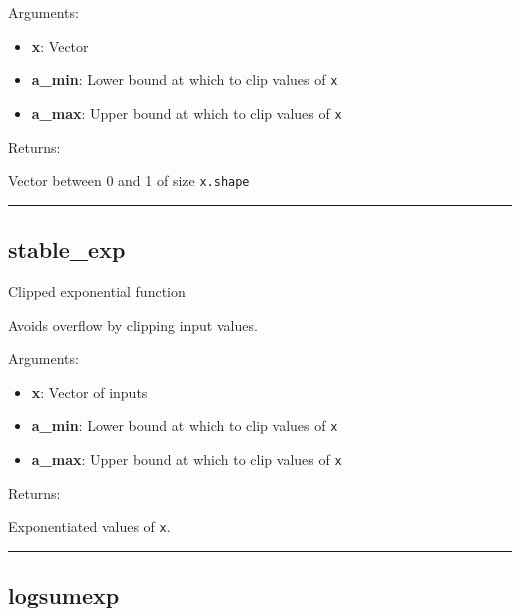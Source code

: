 Arguments:

\begin{itemize}
\tightlist
\item
  \textbf{x}: Vector
\item
  \textbf{a\_min}: Lower bound at which to clip values of \texttt{x}
\item
  \textbf{a\_max}: Upper bound at which to clip values of \texttt{x}
\end{itemize}

Returns:

Vector between 0 and 1 of size \texttt{x.shape}

\begin{center}\rule{0.5\linewidth}{\linethickness}\end{center}

\hypertarget{stable_exp}{%
\subsection{stable\_exp}\label{stable_exp}}

\begin{Shaded}
\begin{Highlighting}[]
\OperatorTok{=-}\OperatorTok{=}\NormalTok{)}
\end{Highlighting}
\end{Shaded}

Clipped exponential function

Avoids overflow by clipping input values.

Arguments:

\begin{itemize}
\tightlist
\item
  \textbf{x}: Vector of inputs
\item
  \textbf{a\_min}: Lower bound at which to clip values of \texttt{x}
\item
  \textbf{a\_max}: Upper bound at which to clip values of \texttt{x}
\end{itemize}

Returns:

Exponentiated values of \texttt{x}.

\begin{center}\rule{0.5\linewidth}{\linethickness}\end{center}

\hypertarget{logsumexp}{%
\subsection{logsumexp}\label{logsumexp}}

